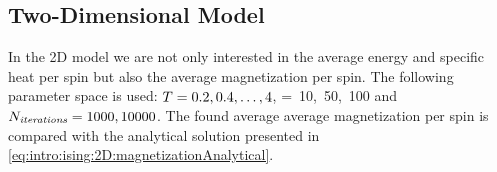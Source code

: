 \subsection{Two-Dimensional Model}
\label{ss:experiment:2D}
	In the 2D model we are not only interested in the average energy and specific heat per spin but also the average magnetization per spin.  The following parameter space is used: \mbox{$T = 0.2, 0.4, \dotsc, 4$}, \mbox{\numberOfSpins = 10, 50, 100} and $N_\textit{iterations} = 1000, 10000$. The found average average magnetization per spin is compared with the analytical solution presented in \cref{eq:intro:ising:2D:magnetizationAnalytical}.

